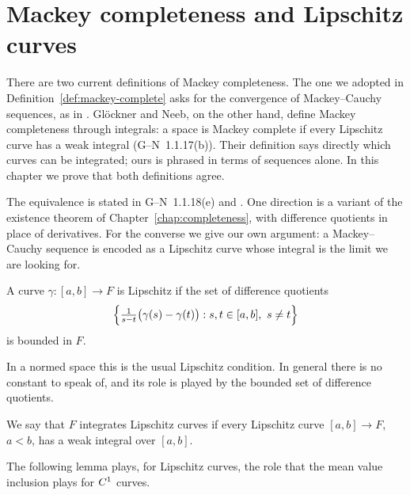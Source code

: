 \chapter{Mackey completeness and Lipschitz curves}
\label{chap:mackey-lipschitz}

There are two current definitions of Mackey completeness. The one we adopted in
Definition~\ref{def:mackey-complete} asks for the convergence of Mackey--Cauchy sequences, as
in \cite[2.2]{KM97}. Glöckner and Neeb, on the other hand, define Mackey completeness through
integrals: a space is Mackey complete if every Lipschitz curve has a weak integral
(G--N~1.1.17(b)). Their definition says directly which curves can be integrated; ours is
phrased in terms of sequences alone. In this chapter we prove that both definitions agree.

The equivalence is stated in G--N~1.1.18(e) and \cite[2.14]{KM97}. One direction is a variant
of the existence theorem of Chapter~\ref{chap:completeness}, with difference quotients in place
of derivatives. For the converse we give our own argument: a Mackey--Cauchy sequence is encoded
as a Lipschitz curve whose integral is the limit we are looking for.

\begin{definition}
  \label{def:lipschitz}
  \leanok
  A curve $\gamma \colon [a, b] \to F$ is Lipschitz if the set of difference quotients
  \[
    \Bigl\{ \tfrac{1}{s - t}\bigl(\gamma(s) - \gamma(t)\bigr) : s, t \in [a, b],\ s \neq t \Bigr\}
  \]
  is bounded in $F$.
\end{definition}

In a normed space this is the usual Lipschitz condition. In general there is no constant to
speak of, and its role is played by the bounded set of difference quotients.

\begin{definition}
  \label{def:integrates-lipschitz}
  \leanok
  We say that $F$ integrates Lipschitz curves if every Lipschitz curve $[a, b] \to F$, $a < b$,
  has a weak integral over $[a, b]$.
\end{definition}

The following lemma plays, for Lipschitz curves, the role that the mean value inclusion plays
for $C^{1}$ curves.

